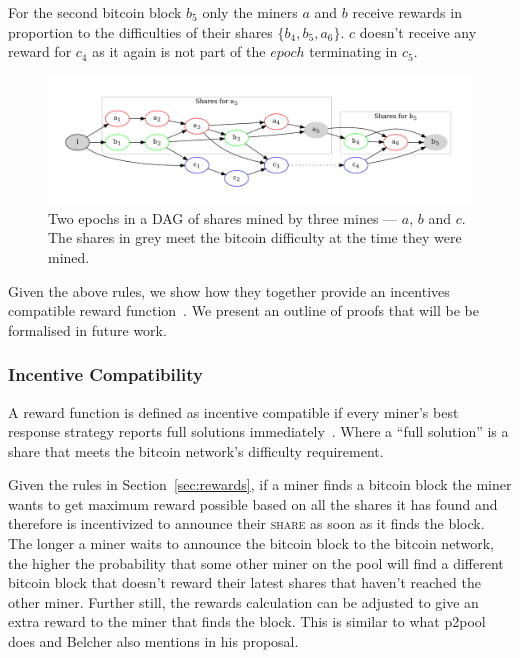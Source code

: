 \documentclass{article}
\begin{document}
For the second bitcoin block $b_5$ only the miners $a$ and $b$ receive
rewards in proportion to the difficulties of their shares
$\{b_4, b_5, a_6\}$. $c$ doesn't receive any reward for $c_4$ as it
again is not part of the $epoch$ terminating in $c_5$.

\begin{figure}
  \begin{center}
    \includegraphics[width=1.0\textwidth]{shares-dag}
    \caption{Two epochs in a DAG of shares mined by three mines ---
      $a$, $b$ and $c$. The shares in grey meet the bitcoin difficulty
      at the time they were mined.}\label{fig:shares-dag}
  \end{center}
\end{figure}

Given the above rules, we show how they together provide an incentives
compatible reward function~\cite{incentives-compatible}. We present an
outline of proofs that will be be formalised in future work.

\subsubsection{Incentive Compatibility}\label{sec:incentive-compatability}

A reward function is defined as incentive compatible if every miner's
best response strategy reports full solutions
immediately~\cite{incentives-compatible}. Where a ``full solution'' is
a share that meets the bitcoin network's difficulty requirement.

Given the rules in Section~\ref{sec:rewards}, if a miner finds a
bitcoin block the miner wants to get maximum reward possible based on
all the shares it has found and therefore is incentivized to announce
their \textsc{share} as soon as it finds the block. The longer a miner
waits to announce the bitcoin block to the bitcoin network, the higher
the probability that some other miner on the pool will find a
different bitcoin block that doesn't reward their latest shares that
haven't reached the other miner. Further still, the rewards
calculation can be adjusted to give an extra reward to the miner that
finds the block. This is similar to what p2pool does and Belcher also
mentions in his proposal.
\end{document}
